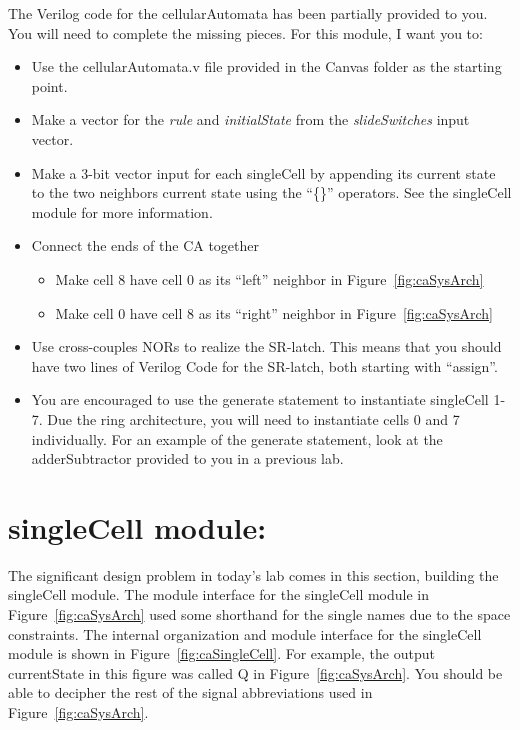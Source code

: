 \protect\hypertarget{cellularAutomata_verilog}{}{}The Verilog code for
the cellularAutomata has been partially provided to you. You will need
to complete the missing pieces. For this module, I want you to:

\begin{itemize}
\item
  Use the cellularAutomata.v file provided in the Canvas folder as the
  starting point.
\item
  Make a vector for the \emph{rule} and \emph{initialState} from the
  \emph{slideSwitches} input vector.
\item
  Make a 3-bit vector input for each singleCell by appending its current
  state to the two neighbors current state using the ``\{\}'' operators.
  See the singleCell module for more information.
\item
  Connect the ends of the CA together

  \begin{itemize}
  \item
    Make cell 8 have cell 0 as its ``left'' neighbor in Figure~\ref{fig:caSysArch}
  \item
    Make cell 0 have cell 8 as its ``right'' neighbor in Figure~\ref{fig:caSysArch}
  \end{itemize}
\item
  Use cross-couples NORs to realize the SR-latch. This means that you
  should have two lines of Verilog Code for the SR-latch, both starting
  with ``assign''.
\item
  You are encouraged to use the generate statement to instantiate
  singleCell 1-7. Due the ring architecture, you will need to
  instantiate cells 0 and 7 individually. For an example of the generate
  statement, look at the adderSubtractor provided to you in a previous
  lab.
\end{itemize}

\hypertarget{singlecell-module}{%
\section{singleCell module:}\label{singlecell-module}}

The significant design problem in today's lab comes in this section,
building the singleCell module. The module interface for the singleCell
module in Figure~\ref{fig:caSysArch} used some shorthand for the single names due to the
space constraints. The internal organization and module interface for
the singleCell module is shown in Figure~\ref{fig:caSingleCell}. For example, the output
currentState in this figure was called Q in Figure~\ref{fig:caSysArch}. You should be able
to decipher the rest of the signal abbreviations used in Figure~\ref{fig:caSysArch}.

